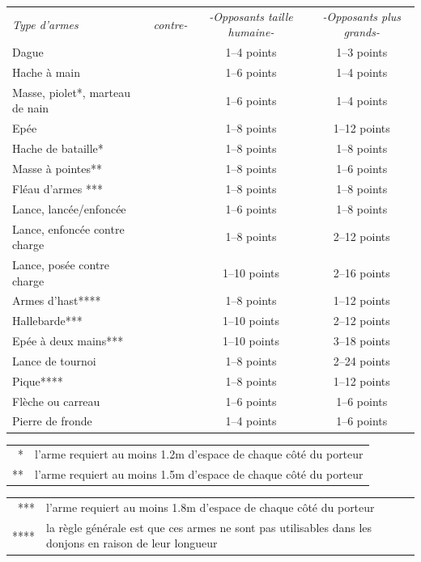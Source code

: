 \begin{tabular}{lccc}
\textit{Type d'armes} & \textit{contre-} & \textit{-Opposants taille humaine-} & \textit{-Opposants plus grands-} \\
Dague                          && 1--4 points  & 1--3 points \\
Hache à main                   && 1--6 points  & 1--4 points \\
Masse, piolet*, marteau de nain && 1--6 points  & 1--4 points \\
Epée                           && 1--8 points  & 1--12 points \\
Hache de bataille*             && 1--8 points  & 1--8 points \\
Masse à pointes**              && 1--8 points  & 1--6 points \\
Fléau d'armes ***              && 1--8 points  & 1--8 points \\
Lance, lancée/enfoncée         && 1--6 points  & 1--8 points \\
Lance, enfoncée contre charge  && 1--8 points  & 2--12 points \\
Lance, posée contre charge     && 1--10 points & 2--16 points \\
Armes d'hast****               && 1--8 points  & 1--12 points \\
Hallebarde***                  && 1--10 points & 2--12 points \\
Epée à deux mains***           && 1--10 points & 3--18 points \\
Lance de tournoi               && 1--8 points  & 2--24 points \\
Pique****                      && 1--8 points  & 1--12 points \\
Flèche ou carreau              && 1--6 points  & 1--6 points \\
Pierre de fronde               && 1--4 points  & 1--6 points \\
\end{tabular}

\begin{tabular}{rp{15cm}}
\multicolumn{1}{r}{*} & l'arme requiert au moins 1.2m d'espace de chaque côté du porteur \\
\multicolumn{1}{r}{**} & l'arme requiert au moins 1.5m d'espace de chaque côté du porteur \\
\end{tabular}

\begin{tabular}{rp{15cm}}
\multicolumn{1}{r}{***} & l'arme requiert au moins 1.8m d'espace de chaque côté du porteur \\
\multicolumn{1}{r}{****} & la règle générale est que ces armes ne sont pas utilisables dans les donjons en raison de leur longueur \\
\end{tabular}

